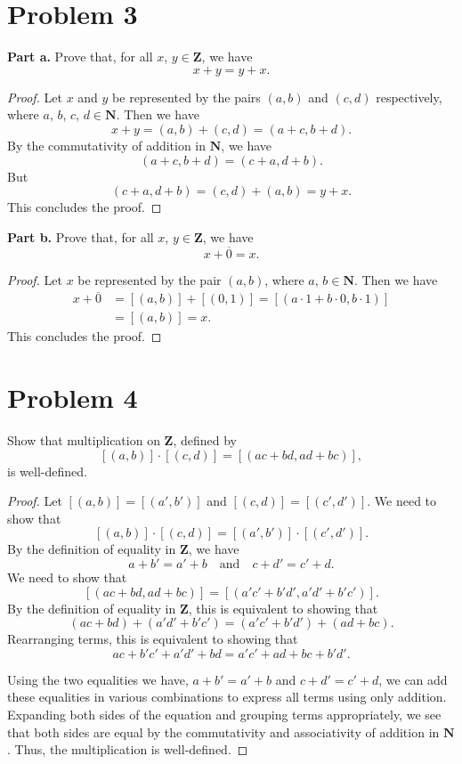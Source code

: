 \documentclass{article}
\begin{document}
\section*{Problem 3}
\textbf{Part a.} Prove that, for all $x$, $y \in \mathbf{Z}$, we have
\[
    x + y = y + x.
\]
\begin{proof}
    Let $x$ and $y$ be represented by the pairs $(a, b)$ and $(c, d)$ respectively, where
    $a$, $b$, $c$, $d \in \mathbf{N}$. Then we have
    \[
        x + y = (a, b) + (c, d) = (a + c, b + d).
    \]
    By the commutativity of addition in $\mathbf{N}$, we have
    \[
        (a + c, b + d) = (c + a, d + b).
    \]
    But
    \[
        (c + a, d + b) = (c, d) + (a, b) = y + x.
    \]
    This concludes the proof.
\end{proof}
\textbf{Part b.} Prove that, for all $x$, $y \in \mathbf{Z}$, we have
\[
    x + \overline{0} = x.
\]
\begin{proof}
    Let $x$ be represented by the pair $(a, b)$, where $a$, $b \in \mathbf{N}$. Then we have
    \begin{align*}
        x + \overline{0} &= [(a, b)] + [(0, 1)] = [(a \cdot 1 + b \cdot 0, b \cdot 1)] \\
        &= [(a, b)] = x.
    \end{align*}
    This concludes the proof.
\end{proof}
\section*{Problem 4}
Show that multiplication on $\mathbf{Z}$, defined by
\[
    [(a, b)] \cdot [(c, d)] = [(ac + bd, ad + bc)],
\]
is well-defined.
\begin{proof}
    Let $[(a, b)] = [(a', b')]$ and $[(c, d)] = [(c', d')]$. We need to show that
    \[
        [(a, b)] \cdot [(c, d)] = [(a', b')] \cdot [(c', d')].
    \]
    By the definition of equality in $\mathbf{Z}$, we have
    \[
        a + b' = a' + b \quad \text{and} \quad c + d' = c' + d.
    \]
    We need to show that
    \[
        [(ac + bd, ad + bc)] = [(a'c' + b'd', a'd' + b'c')].
    \]
    By the definition of equality in $\mathbf{Z}$, this is equivalent to showing that
    \[
        (ac + bd) + (a'd' + b'c') = (a'c' + b'd') + (ad + bc).
    \]
    Rearranging terms, this is equivalent to showing that
    \[
        ac + b'c' + a'd' + bd = a'c' + ad + bc + b'd'.
    \]

    Using the two equalities we have, $a + b' = a' + b$ and $c + d' = c' + d$, 
    we can add these equalities in various combinations to express all terms 
    using only addition. Expanding both sides of the equation and grouping terms 
    appropriately, we see that both sides are equal by the commutativity and associativity of addition in $\mathbf{N}$. Thus, the multiplication is well-defined.
\end{proof}
\end{document}
